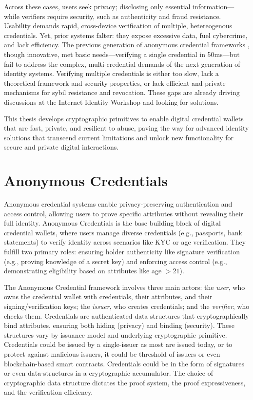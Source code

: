 Across these cases, users seek privacy; disclosing only essential information—while verifiers require security, such as authenticity and fraud resistance. Usability demands rapid, cross-device verification of multiple, hetereogenous credentials. Yet, prior systems falter: they expose excessive data, fuel cybercrime, and lack efficiency. The previous generation of anonymous credential frameworks \cite{hutchison_signature_2004, hutchison_constant-size_2006, sako_short_2016}, though innovative, met basic needs—verifying a single credential in 50ms—but fail to address the complex, multi-credential demands of the next generation of identity systems. Verifying multiple credentials is either too slow, lack a theoretical framework and security properties, or lack efficient and private mechanisms for sybil resistance and revocation. These gaps are already driving discussions at the Internet Identity Workshop \cite{internet_identity_workshop_internet_2025} and looking for solutions.

This thesis develops cryptographic primitives to enable digital credential wallets that are fast, private, and resilient to abuse, paving the way for advanced identity solutions that transcend current limitations and unlock new functionality for secure and private digital interactions.


\section{Anonymous Credentials}
Anonymous credential systems enable privacy-preserving authentication and access control, allowing users to prove specific attributes without revealing their full identity. Anonymous Credentials is the base building block of digital credential wallets, where users manage diverse credentials (e.g., passports, bank statements) to verify identity across scenarios like KYC or age verification. They fulfill two primary roles: ensuring holder authenticity like signature verification (e.g., proving knowledge of a secret key) and enforcing access control (e.g., demonstrating eligibility based on attributes like age $ > 21 $).

The Anonymous Credential framework involves three main actors: the \emph{user}, who owns the credential wallet with credentials, their attributes, and their signing/verification keys; the \emph{issuer}, who creates credentials; and the \emph{verifier}, who checks them. Credentials are authenticated data structures that cryptographically bind attributes, ensuring both hiding (privacy) and binding (security). These structures vary by issuance model and underlying cryptographic primitive. Credentials could be issued by a single-issuer as most are issued today, or to protect against malicious issuers, it could be threshold of issuers or even blockchain-based smart contracts. Credentials could be in the form of signatures or even data-structures in a cryptographic accumulator. The choice of cryptographic data structure dictates the proof system, the proof expressiveness, and the verification efficiency.


